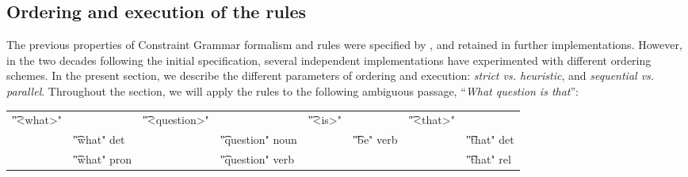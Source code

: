 \subsection{Ordering and execution of the rules}\label{sec:ordering}

The previous properties of Constraint Grammar formalism and rules were
specified by \citet{karlsson1995constraint}, and retained in further
implementations.  However, in the two decades following the initial
specification, several independent implementations have experimented
with different ordering schemes. In the present section, we describe
the different parameters of ordering and execution: \emph{strict
  vs. heuristic}, and \emph{sequential vs. parallel}.  Throughout the
section, we will apply the rules to the following ambiguous passage,
``{\em What question is that}'':

\begin{tabular}{p{0.6cm} l  p{0.6cm} l p{0.6cm} l p{0.6cm} l}
\t{"<what>"}     &                      &  \t{"<question>"}        &  & \t{"<is>"}         & & \t{"<that>"} \\
                 & \t{"what" det}       & &      \t{"question" noun}  &  &    \t{"be" verb}  & &    \t{"that" det}  \\
                 & \t{"what" pron}      & &      \t{"question" verb}  &  &                   & &    \t{"that" rel} \\
\end{tabular}


\def\satcgMax{SAT-CG\textsubscript{Max}}
\def\satcgOrd{SAT-CG\textsubscript{Ord}}
\def\noncg#1{{\em \color{gray} #1}}

